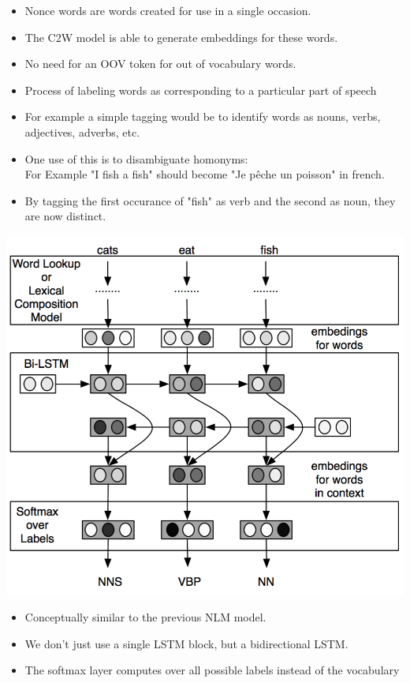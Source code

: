 \documentclass[11pt, a4paper, landscape]{article}
\begin{document}
\vfill
\begin{itemize}
\item Nonce words are words created for use in a single occasion.
\item The C2W model is able to generate embeddings for these words.
\item No need for an OOV token for out of vocabulary words.
\end{itemize}
\vfill

\NewPage{}

\vfill
\begin{itemize}
\item Process of labeling words as corresponding to a particular part of speech
\item For example a simple tagging would be to identify words as nouns, verbs, adjectives, adverbs, etc.
\item One use of this is to disambiguate homonyms:\\ For Example "I fish a fish" should become "Je pêche un poisson" in french.
\item By tagging the first occurance of "fish" as verb and the second as noun, they are now distinct.
\end{itemize}
\vfill

\NewPage{}

\begin{center}
    \includegraphics[width=.5\linewidth]{../article/img/part-of-speech}
\end{center}
\vfill
\begin{itemize}
\item Conceptually similar to the previous NLM model.
\item We don't just use a single LSTM block, but a bidirectional LSTM.
\item The softmax layer computes over all possible labels instead of the vocabulary
\end{itemize}
\vfill
\end{document}

